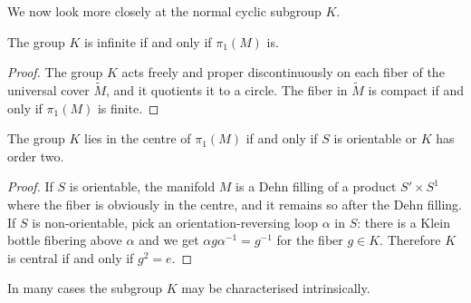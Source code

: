 We now look more closely at the normal cyclic subgroup $K$.

\begin{prop} \label{infinite:K:prop}
The group $K$ is infinite if and only if $\pi_1(M)$ is.
\end{prop}
\begin{proof}
The group $K$ acts freely and proper discontinuously on each fiber of the universal cover $\tilde M$, and it quotients it to a circle. The fiber in $\tilde M$ is compact if and only if $\pi_1(M)$ is finite.
\end{proof}

\begin{prop} \label{central:prop}
The group $K$ lies in the centre of $\pi_1(M)$ if and only if $S$ is orientable or $K$ has order two.
\end{prop}
\begin{proof}
If $S$ is orientable, the manifold $M$ is a Dehn filling of a product $S' \times S^1$ where the fiber is obviously in the centre, and it remains so after the Dehn filling. If $S$ is non-orientable, pick an orientation-reversing loop $\alpha$ in $S$: there is a Klein bottle fibering above $\alpha$ and we get $\alpha g \alpha^{-1} = g^{-1}$ for the fiber $g\in K$. Therefore $K$ is central if and only if $g^2 = e$.
\end{proof}

In many cases the subgroup $K$ may be characterised intrinsically.

